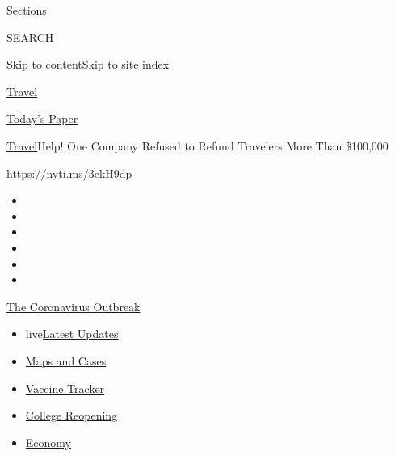 Sections

SEARCH

\protect\hyperlink{site-content}{Skip to
content}\protect\hyperlink{site-index}{Skip to site index}

\href{https://www.nytimes.com/section/travel}{Travel}

\href{https://myaccount.nytimes.com/auth/login?response_type=cookie\&client_id=vi}{}

\href{https://www.nytimes.com/section/todayspaper}{Today's Paper}

\href{/section/travel}{Travel}\textbar{}Help! One Company Refused to
Refund Travelers More Than \$100,000

\url{https://nyti.ms/3ekH9dp}

\begin{itemize}
\item
\item
\item
\item
\item
\item
\end{itemize}

\href{https://www.nytimes.com/news-event/coronavirus?action=click\&pgtype=Article\&state=default\&region=TOP_BANNER\&context=storylines_menu}{The
Coronavirus Outbreak}

\begin{itemize}
\tightlist
\item
  live\href{https://www.nytimes.com/2020/08/04/world/coronavirus-cases.html?action=click\&pgtype=Article\&state=default\&region=TOP_BANNER\&context=storylines_menu}{Latest
  Updates}
\item
  \href{https://www.nytimes.com/interactive/2020/us/coronavirus-us-cases.html?action=click\&pgtype=Article\&state=default\&region=TOP_BANNER\&context=storylines_menu}{Maps
  and Cases}
\item
  \href{https://www.nytimes.com/interactive/2020/science/coronavirus-vaccine-tracker.html?action=click\&pgtype=Article\&state=default\&region=TOP_BANNER\&context=storylines_menu}{Vaccine
  Tracker}
\item
  \href{https://www.nytimes.com/2020/08/02/us/covid-college-reopening.html?action=click\&pgtype=Article\&state=default\&region=TOP_BANNER\&context=storylines_menu}{College
  Reopening}
\item
  \href{https://www.nytimes.com/live/2020/08/04/business/stock-market-today-coronavirus?action=click\&pgtype=Article\&state=default\&region=TOP_BANNER\&context=storylines_menu}{Economy}
\end{itemize}

